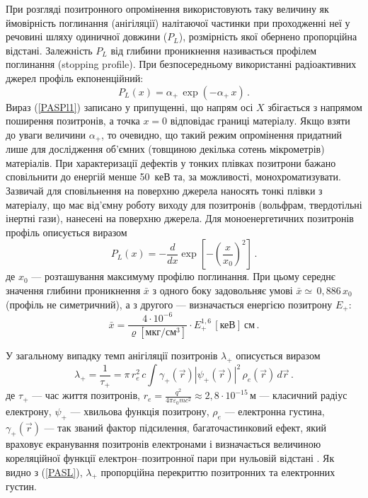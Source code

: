 При розгляді позитронного опромінення використовують
таку величину як ймовірність поглинання (анігіляції) налітаючої частинки
при проходженні неї у речовині шляху одиничної довжини ($P_L$),
розмірність якої обернено пропорційна відстані.
Залежність $P_L$ від глибини проникнення називається профілем поглинання (stopping profile).
При безпосередньому використанні радіоактивних джерел профіль екпоненційний:
\begin{equation}\label{PASPl1}
P_L(x)=\alpha_+\,\exp(-\alpha_+\,x)\,.
\end{equation}
Вираз (\ref{PASPl1}) записано у припущенні, що
напрям осі $X$ збігається з напрямом поширення позитронів,
а точка $x=0$ відповідає границі матеріалу.
Якщо взяти до уваги величини $\alpha_+$, то очевидно,
що такий режим опромінення придатний лише для дослідження об'ємних
(товщиною декілька сотень мікрометрів) матеріалів.
При характеризації дефектів у тонких плівках позитрони
бажано сповільнити до енергій менше 50~кеВ та, за можливості, монохроматизувати.
Зазвичай для сповільнення на поверхню джерела наносять тонкі плівки з матеріалу, що має
від'ємну роботу виходу для позитронів (вольфрам, твердотільні інертні гази), нанесені на поверхню джерела.
Для моноенергетичних позитронів профіль описується виразом
\begin{equation}\label{PASPl2}
P_L(x)=-\frac{d}{dx}\exp\left[-\left(\frac{x}{x_0}\right)^2\right]\,.
\end{equation}
де
$x_0$ --- розташування максимуму профілю поглинання.
При цьому середнє значення глибини проникнення $\bar{x}$  з одного боку
задовольняє умові $\bar{x}\simeq \,0,886\, x_0$ (профіль не симетричний),
а з другого --- визначається енергією позитрону $E_{+}$:
\begin{equation}
\bar{x}=\frac{4\cdot10^{-6}}{\varrho\left[\text{мкг}/\text{см}^3\right]}\cdot E_{+}^{1,6}\,[\text{кеВ}]\:\text{см}\,.
\end{equation}

У загальному випадку темп анігіляції позитронів $\lambda_+$ описується виразом
\begin{equation}\label{PASL}
\lambda_+=\frac{1}{\tau_+}=\pi\,r_e^2\,c\int\gamma_+(\overrightarrow{r})\left|\psi_+(\overrightarrow{r})\right|^2\,\rho_e(\overrightarrow{r})\,d\overrightarrow{r}\,.
\end{equation}
де
$\tau_+$ --- час життя позитронів,
$r_e=\frac{q^2}{4\pi\varepsilon_0 m c^2}\approx2,8\cdot10^{-15}\,\text{м}$ --- класичний радіус електрону,
$\psi_+$ --- хвильова функція позитрону,
$\rho_e$ --- електронна густина,
$\gamma_+(\overrightarrow{r})$ --- так званий фактор підсилення, багаточастинковий ефект,
який враховує екранування позитронів електронами і визначається величиною
кореляційної функції електрон--позитронної пари при нульовій відстані \cite{tuomisto2019}.
Як видно з (\ref{PASL}), $\lambda_+$ пропорційна перекриттю позитронних та електронних густин.

